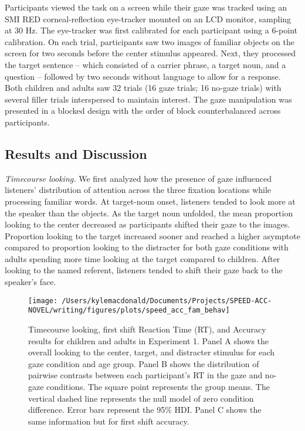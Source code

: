 \documentclass[10pt, letterpaper]{article}
\newenvironment{CodeChunk}{}{}
\begin{document}
Participants viewed the task on a screen while their gaze was tracked
using an SMI RED corneal-reflection eye-tracker mounted on an LCD
monitor, sampling at 30 Hz. The eye-tracker was first calibrated for
each participant using a 6-point calibration. On each trial,
participants saw two images of familiar objects on the screen for two
seconds before the center stimulus appeared. Next, they processed the
target sentence -- which consisted of a carrier phrase, a target noun,
and a question -- followed by two seconds without language to allow for
a response. Both children and adults saw 32 trials (16 gaze trials; 16
no-gaze trials) with several filler trials interspersed to maintain
interest. The gaze manipulation was presented in a blocked design with
the order of block counterbalanced across participants.

\hypertarget{results-and-discussion}{%
\subsection{Results and Discussion}\label{results-and-discussion}}

\emph{Timecourse looking.} We first analyzed how the presence of gaze
influenced listeners' distribution of attention across the three
fixation locations while processing familiar words. At target-noun
onset, listeners tended to look more at the speaker than the objects. As
the target noun unfolded, the mean proportion looking to the center
decreased as participants shifted their gaze to the images. Proportion
looking to the target increased sooner and reached a higher asymptote
compared to proportion looking to the distracter for both gaze
conditions with adults spending more time looking at the target compared
to children. After looking to the named referent, listeners tended to
shift their gaze back to the speaker's face.

\begin{CodeChunk}
\begin{figure*}[t]

{\centering \texttt{[image: /Users/kylemacdonald/Documents/Projects/SPEED-ACC-NOVEL/writing/figures/plots/speed\_acc\_fam\_behav]} 

}

\caption[Timecourse looking, first shift Reaction Time (RT), and Accuracy results for children and adults in Experiment 1]{Timecourse looking, first shift Reaction Time (RT), and Accuracy results for children and adults in Experiment 1. Panel A shows the overall looking to the center, target, and distracter stimulus for each gaze condition and age group. Panel B shows the distribution of pairwise contrasts between each participant's RT in the gaze and no-gaze conditions. The square point represents the group means. The vertical dashed line represents the null model of zero condition difference. Error bars represent the 95\% HDI. Panel C shows the same information but for first shift accuracy.}\label{fig:speed-acc-gaze-results}
\end{figure*}
\end{CodeChunk}
\end{document}
